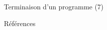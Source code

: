 \documentclass[12pt,t]{beamer}
\begin{document}
\begin{frame}{Terminaison d'un programme (7)}
\end{frame}

\begin{frame}{Références}
\end{frame}
\end{document}
